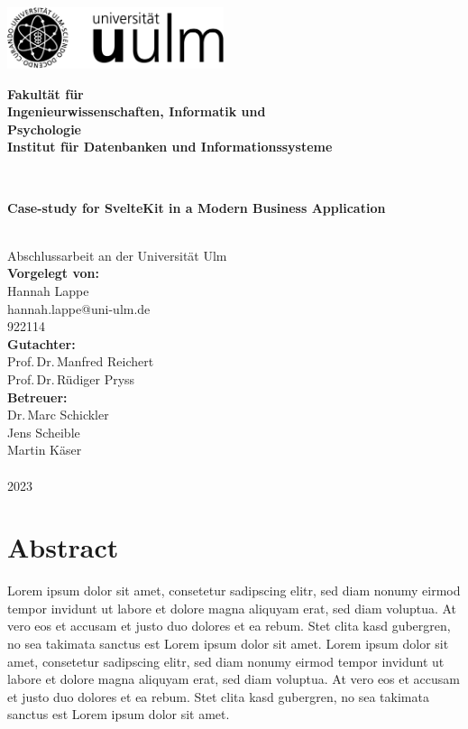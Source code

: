 \documentclass[a4paper,
fontsize=12pt,
headsepline,           %
oneside,               %
number=noenddot,       %
bibliography=totoc,    %
BCOR=15mm              %
]{scrbook}
\makeatletter
\newcommand{\fullname}{Hannah Lappe}
\newcommand{\email}{hannah.lappe@uni-ulm.de}
\newcommand{\titel}{Case-study for SvelteKit in a Modern Business Application}
\newcommand{\jahr}{2023}
\newcommand{\matnr}{922114}
\newcommand{\gutachterA}{Prof.\,Dr.\,Manfred Reichert}
\newcommand{\gutachterB}{Prof.\,Dr.\,Rüdiger Pryss}
\newcommand{\betreuer}{Dr.\,Marc Schickler\\Jens Scheible\\Martin Käser}
\newcommand{\fakultaet}{Ingenieurwissenschaften, Informatik und\\Psychologie}
\newcommand{\institut}{Institut für Datenbanken und Informationssysteme}
\makeatother
\begin{document}
\frontmatter

\thispagestyle{empty}
\begin{addmargin*}[4mm]{-10mm}

  \hfill
  \includegraphics[height=1.8cm]{assets/logo_uulm_sw.png}\\[1em]

  {\footnotesize
  \hspace*{115mm}\parbox[t]{35mm}{\bfseries Fakultät für\\
    \fakultaet\\
    \mdseries \institut}\\[2cm]

  \parbox{140mm}{\bfseries \LARGE \titel}\\[2.5em]
  {\footnotesize Abschlussarbeit an der Universität Ulm}\\[3em]

  {\footnotesize \bfseries Vorgelegt von:}\\
  {\footnotesize \fullname\\ \email}\\ \matnr\\[2em]
  {\footnotesize \bfseries Gutachter:}\\
  {\footnotesize \gutachterA\\ \gutachterB}\\[2em]
  {\footnotesize \bfseries Betreuer:}\\
  {\footnotesize \betreuer}\\\\
  {\footnotesize \jahr}
  }
\end{addmargin*}


\clearpage
\thispagestyle{empty}
\chapter*{Abstract}

Lorem ipsum dolor sit amet, consetetur sadipscing elitr, sed diam nonumy eirmod tempor invidunt ut labore et dolore magna aliquyam erat, sed diam voluptua. At vero eos et accusam et justo duo dolores et ea rebum. Stet clita kasd gubergren, no sea takimata sanctus est Lorem ipsum dolor sit amet. Lorem ipsum dolor sit amet, consetetur sadipscing elitr, sed diam nonumy eirmod tempor invidunt ut labore et dolore magna aliquyam erat, sed diam voluptua. At vero eos et accusam et justo duo dolores et ea rebum. Stet clita kasd gubergren, no sea takimata sanctus est Lorem ipsum dolor sit amet.
\end{document}
